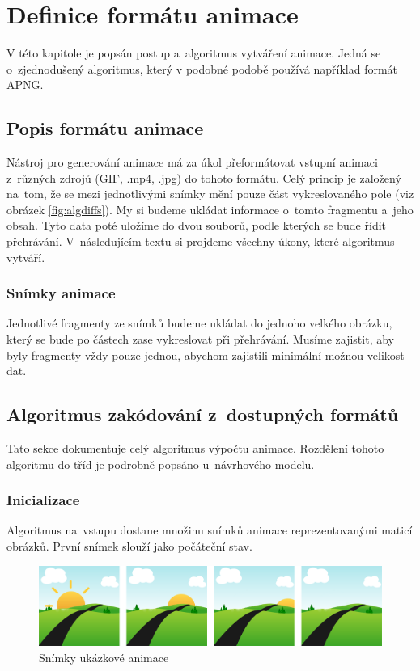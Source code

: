 \chapter{Definice formátu animace}

V této kapitole je popsán postup a~algoritmus vytváření animace. Jedná se o~zjednodušený algoritmus, který v podobné podobě používá například formát APNG\cite{apngFrames}. 


\section{Popis formátu animace}

Nástroj pro generování animace má za úkol přeformátovat vstupní animaci z~různých zdrojů (GIF, .mp4, .jpg) do tohoto formátu. Celý princip je založený na~tom, že se mezi jednotlivými snímky mění pouze část vykreslovaného pole (viz obrázek \ref{fig:algdiffs}). My si budeme ukládat informace o~tomto fragmentu a~jeho obsah. Tyto data poté uložíme do dvou souborů, podle kterých se bude řídit přehrávání. V~následujícím textu si projdeme všechny úkony, které algoritmus vytváří.

\subsection*{Snímky animace}

Jednotlivé fragmenty ze snímků budeme ukládat do jednoho velkého obrázku, který se bude po částech zase vykreslovat při přehrávání. Musíme zajistit, aby byly fragmenty vždy pouze jednou, abychom zajistili minimální možnou velikost dat. 


\section{Algoritmus zakódování z~dostupných formátů}
\label{section:algencode}

Tato sekce dokumentuje celý algoritmus výpočtu animace. Rozdělení tohoto algoritmu do tříd je podrobně popsáno u~návrhového modelu. 

\subsection{Inicializace}
Algoritmus na~vstupu dostane množinu snímků animace reprezentovanými maticí obrázků. První snímek slouží jako počáteční stav. 

\begin{figure}[h]
\centering
\includegraphics[width=1\textwidth]{figures/alg-frames.png}
\caption{Snímky ukázkové animace}
\label{fig:algframes}
\end{figure}

